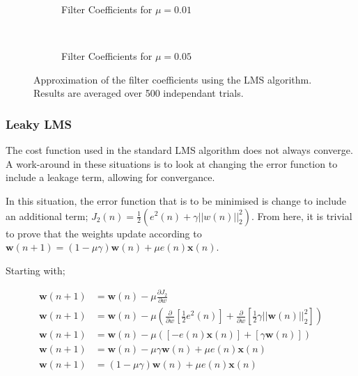 \documentclass[main.tex]{subfiles}
\begin{document}
\begin{figure}[H]
	\centering
	\begin{subfigure}[b]{0.45\textwidth}
		\resizebox{\textwidth}{!}{}
		\caption{Filter Coefficients for $\mu = 0.01$}
	\end{subfigure}%
	~ %
	\begin{subfigure}[b]{0.45\textwidth}
		\resizebox{\textwidth}{!}{}
		\caption{Filter Coefficients for $\mu = 0.05$}
	\end{subfigure}
	\caption{Approximation of the filter coefficients using the LMS algorithm. Results are averaged over 500 independant trials.}
	\label{fig:animals}
\end{figure}










\subsubsection{Leaky LMS}

The cost function used in the standard LMS algorithm does not always converge. A work-around in these situations is to look at changing the error function to include a leakage term, allowing for convergance. 

In this situation, the error function that is to be minimised is change to include an additional term; $J_2(n) = \frac{1}{2}(e^2(n) + \gamma||w(n)||^2_2)$. From here, it is trivial to prove that the weights update according to $\textbf{w}(n+1) = (1-\mu \gamma)\textbf{w}(n) + \mu e(n)\textbf{x}(n)$.

Starting with;


\begin{align*}
\textbf{w}(n+1) &= \textbf{w}(n) - \mu\frac{\partial J_2}{\partial w}\\
\textbf{w}(n+1) &= \textbf{w}(n) - \mu\left(\frac{\partial}{\partial w}\left[\frac{1}{2}e^2(n)\right] + \frac{\partial}{\partial w}\left[\frac{1}{2}\gamma||\textbf{w}(n)||^2_2\right]\right)\\
\textbf{w}(n+1) &= \textbf{w}(n) - \mu\left(\left[-e(n)\textbf{x}(n)\right] + \left[\gamma\textbf{w}(n)\right]\right)\\
\textbf{w}(n+1) &= \textbf{w}(n) - \mu\gamma\textbf{w}(n) + \mu e(n)\textbf{x}(n)\\
\textbf{w}(n+1) &= (1-\mu\gamma)\textbf{w}(n) + \mu e(n)\textbf{x}(n)
\end{align*}
\end{document}
